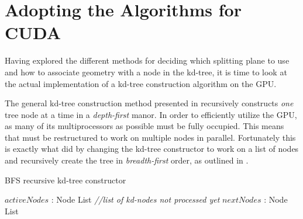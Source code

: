 \section{Adopting the Algorithms for CUDA}\label{sec:kdTreeImpl}


Having explored the different methods for deciding which splitting plane to use
and how to associate geometry with a node in the kd-tree, it is time to look at
the actual implementation of a kd-tree construction algorithm on the GPU.

The general kd-tree construction method presented in 
recursively constructs \textit{one} tree node at a time in a
\textit{depth-first} manor. In order to efficiently utilize the GPU, as many of
its multiprocessors as possible must be fully occupied. This means that
 must be restructured to work on multiple nodes in
parallel. Fortunately this is exactly what \zhou{} did by changing the kd-tree
constructor to work on a list of nodes and recursively create the tree in
\textit{breadth-first} order, as outlined in .

\begin{algorithm}
  \caption{BFS recursive kd-tree constructor}
  \label{alg:bfsKDTreeCreator}
  \begin{algorithmic}
              {$activeNodes$ : Node List  \textit{\color{gray}//list of kd-nodes not processed yet}}
              {$nextNodes$ : Node List}
              {
                 \ELSE
                 \ENDIF
               \ENDFOR}
  \end{algorithmic}
\end{algorithm}


